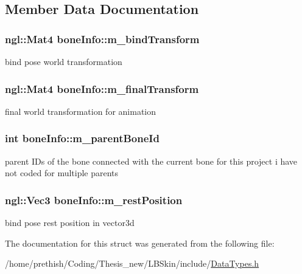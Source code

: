 \subsection{Member Data Documentation}
\hypertarget{structbone_info_a76b97b00a65fcc7f0da632b4482f2736}{
\subsubsection[{m\-\_\-bind\-Transform}]{\setlength{\rightskip}{0pt plus 5cm}ngl\-::\-Mat4 bone\-Info\-::m\-\_\-bind\-Transform}}\label{structbone_info_a76b97b00a65fcc7f0da632b4482f2736}


bind pose world transformation 

\hypertarget{structbone_info_a9ce75c67a0531088b753748b1a0d662f}{
\subsubsection[{m\-\_\-final\-Transform}]{\setlength{\rightskip}{0pt plus 5cm}ngl\-::\-Mat4 bone\-Info\-::m\-\_\-final\-Transform}}\label{structbone_info_a9ce75c67a0531088b753748b1a0d662f}


final world transformation for animation 

\hypertarget{structbone_info_a6658fd0f8b4d914039cb6c1e21a59d33}{
\subsubsection[{m\-\_\-parent\-Bone\-Id}]{\setlength{\rightskip}{0pt plus 5cm}int bone\-Info\-::m\-\_\-parent\-Bone\-Id}}\label{structbone_info_a6658fd0f8b4d914039cb6c1e21a59d33}


parent I\-Ds of the bone connected with the current bone for this project i have not coded for multiple parents 

\hypertarget{structbone_info_aa1d6e7a3b0575366ff7927f6087fe204}{
\subsubsection[{m\-\_\-rest\-Position}]{\setlength{\rightskip}{0pt plus 5cm}ngl\-::\-Vec3 bone\-Info\-::m\-\_\-rest\-Position}}\label{structbone_info_aa1d6e7a3b0575366ff7927f6087fe204}


bind pose rest position in vector3d 



The documentation for this struct was generated from the following file\-:\begin{DoxyCompactItemize}
\item 
/home/prethish/\-Coding/\-Thesis\-\_\-new/\-L\-B\-Skin/include/\hyperlink{_data_types_8h}{Data\-Types.\-h}\end{DoxyCompactItemize}
